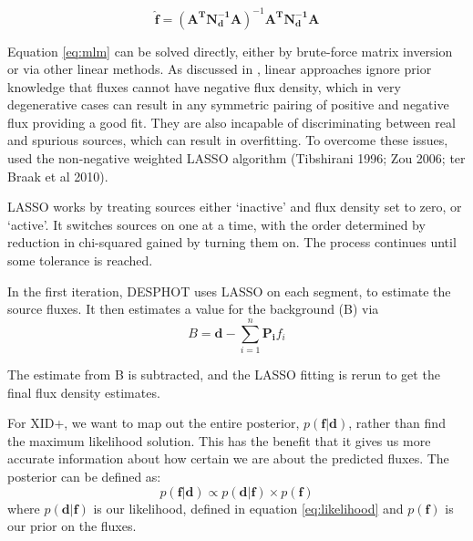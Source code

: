 \documentclass[useAMS,usenatbib]{mn2e}
\begin{document}
\begin{equation}
\hat{\mathbf{f}}=(\mathbf{A^TN_d^{-1}A})^{-1}\mathbf{A^TN_d^{-1}A}\label{eq:mlm}
\end{equation}

Equation \ref{eq:mlm} can be solved directly, either by brute-force matrix inversion or via other linear methods. As discussed in \cite{Roseboom:2010, Roseboom:2011, Wang:2014}, linear approaches ignore prior knowledge that fluxes cannot have negative flux density, which in very degenerative cases can result in any symmetric pairing of positive and negative flux providing a good fit. They are also incapable of discriminating between real and spurious sources, which can result in overfitting. To overcome these issues, \cite{Roseboom:2011} used the non-negative weighted LASSO algorithm (Tibshirani 1996; Zou 2006; ter Braak et al 2010).

LASSO works by treating sources either `inactive' and flux density set to zero, or `active'. It switches sources on one at a time, with the order determined by reduction in chi-squared gained by turning them on. The process continues until some tolerance is reached.

In the first iteration, DESPHOT uses LASSO on each segment, to estimate the source fluxes. It then estimates a value for the background (B) via
\begin{equation}
B = \mathbf{d} - \sum\limits_{i=1}^n \mathbf{P_i}f_i
\end{equation} 

The estimate from B is subtracted, and the LASSO fitting is rerun to get the final flux density estimates.

For XID+, we want to map out the entire posterior, $p(\mathbf{f}|\mathbf{d})$, rather than find the maximum likelihood solution. This has the benefit that it gives us more accurate information about how certain we are about the predicted fluxes. The posterior can be defined as:
\begin{equation}
p(\mathbf{f}|\mathbf{d}) \propto p(\mathbf{d}|\mathbf{f}) \times p(\mathbf{f})
\end{equation}
where $p(\mathbf{d}|\mathbf{f})$ is our likelihood, defined in equation \ref{eq:likelihood} and $p(\mathbf{f})$ is our prior on the fluxes. 
\end{document}

